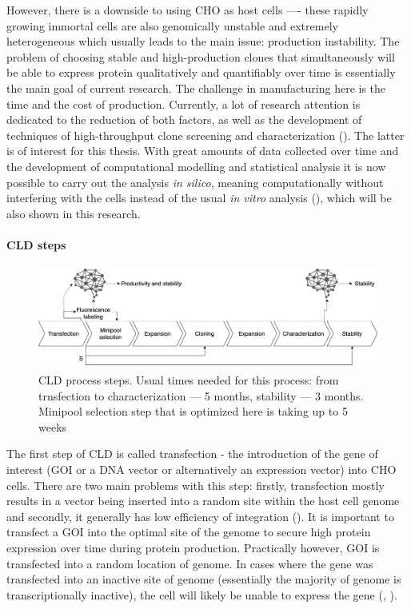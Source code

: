 However, there is a downside to using CHO as host cells ---- these rapidly growing immortal cells are also genomically unstable and extremely heterogeneous which usually leads to the main issue: production instability. The problem of choosing stable and high-production clones that simultaneously will be able to express protein qualitatively and quantifiably over time is essentially the main goal of current research. The challenge in manufacturing here is the time and the cost of production. Currently, a lot of research attention is dedicated to the reduction of both factors, as well as the development of techniques of high-throughput clone screening and characterization (\cite{Tihanyi_2020}). The latter is of interest for this thesis. With great amounts of data collected over time and the development of computational modelling and statistical analysis it is now possible to carry out the analysis \textit{in silico}, meaning computationally without interfering with the cells instead of the usual \textit{in vitro} analysis (\cite{Christiansen_2018}), which will be also shown in this research.

\paragraph{CLD steps}
\label{section:cld-steps}
\begin{figure}[H]
	\begin{center}
		\includegraphics[width=0.8\linewidth]{bilder/CLD.png}
		\caption[CLD process steps]%
		{CLD process steps. Usual times needed for this process: from trnsfection to characterization --- 5 months, stability --- 3 months. Minipool selection step that is optimized here is taking up to 5 weeks}\label{fig:cls-steps}
	\end{center}
\end{figure}

The first step of CLD is called transfection - the introduction of the gene of interest (GOI or a DNA vector or alternatively an expression vector) into CHO cells. There are two main problems with this step: firstly, transfection mostly results in a vector being inserted into a random site within the host cell genome and secondly, it generally has low efficiency of integration  (\cite{Tihanyi_2020}). It is important to transfect a GOI into the optimal site of the genome to secure high protein expression over time during protein production. Practically however, GOI is transfected into a random location of genome. In cases where the gene was transfected into an inactive site of genome (essentially the majority of genome is transcriptionally inactive), the cell will likely be unable to express the gene (\cite{Castan_2018}, \cite{Hong_2018}).

